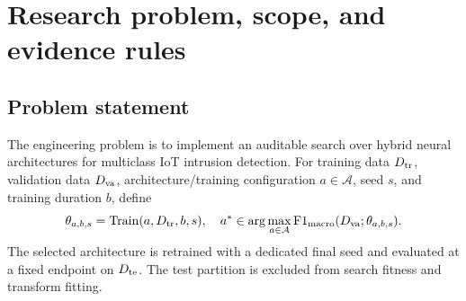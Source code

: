 \documentclass[11pt,a4paper]{report}
\begin{document}
\begin{abstract}
Neural architecture search for intrusion detection requires useful evaluation under limited compute. This report documents a 73-bit BPSO CNN--RNN framework and investigates multi-fidelity allocation on real Gas Pipeline data. An earlier archive-based uncertainty-aware (UA) method reduced online GPU use but required 403.82 GPU seconds of predictor observations, eliminating end-to-end savings. We implement an archive-free candidate that begins as BPSO with successive halving (SH). It learns only from search-generated observations using architecture-disjoint, prequentially checked CPU prediction. In 42 fresh compute-limited runs across three seeds, the full archive-free method used 11.947 GPU seconds on average. This is the mean time to reach a validation macro-F1 of 0.6 or to exhaust the cap. Standard BPSO used 16.824 GPU seconds, giving a reduction of 28.99\% in total GPU computation. Targets were attained in 2/3 versus 1/3 seeds. However, predictive promotion never activated in the short searches. Results matched ordinary halving, so the measured saving is attributable to multi-fidelity fallback rather than online uncertainty learning. DEHB, the strongest baseline, reached 3/3 targets using 6.778 GPU seconds. Existing test results use a historical split already known during development. The work supports reproducible engineering and removal of archive overhead; superiority or novelty of uncertainty-aware optimization remains unsupported. The technical chapters retain the implementation details and earlier validation records; the final recorded search suite passed 110 CPU and 55 targeted CUDA-configured tests.
\end{abstract}
\tableofcontents
\listoffigures
\listoftables

\chapter{Research problem, scope, and evidence rules}
\section{Problem statement}
The engineering problem is to implement an auditable search over hybrid neural architectures for multiclass IoT intrusion detection. For training data $D_{\rm tr}$, validation data $D_{\rm va}$, architecture/training configuration $a\in\mathcal A$, seed $s$, and training duration $b$, define
\begin{equation}
 \theta_{a,b,s}=\operatorname{Train}(a,D_{\rm tr},b,s),\quad
 a^*\in\arg\max_{a\in\mathcal A}\mathrm{F1}_{\mathrm{macro}}(D_{\rm va};\theta_{a,b,s}).
\end{equation}
The selected architecture is retrained with a dedicated final seed and evaluated at a fixed endpoint on $D_{\rm te}$. The test partition is excluded from search fitness and transform fitting.
\end{document}
